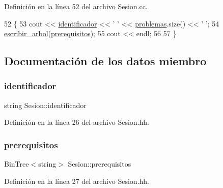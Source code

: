 Definición en la línea 52 del archivo Sesion.\+cc.


\begin{DoxyCode}
52                              \{
53   cout << \mbox{\hyperlink{class_sesion_a1b9a6519f3476c8c733792dee9b9c842}{identificador}} << \textcolor{charliteral}{' '} << \mbox{\hyperlink{class_sesion_af3929f5b3478c9ab1334b4c62566d69e}{problemas}}.size() << \textcolor{charliteral}{' '};
54   \mbox{\hyperlink{class_sesion_a05641874607ce3a3b3c495437938bf02}{escribir\_arbol}}(\mbox{\hyperlink{class_sesion_abdfe53bdef12bfa9ab510cad99b0de27}{prerequisitos}});
55   cout << endl;
56 
57 \}
\end{DoxyCode}


\subsection{Documentación de los datos miembro}
\mbox{\label{class_sesion_a1b9a6519f3476c8c733792dee9b9c842}} 
\subsubsection{\texorpdfstring{identificador}{identificador}}
{\footnotesize\ttfamily string Sesion\+::identificador\hspace{0.3cm}{\ttfamily [private]}}



Definición en la línea 26 del archivo Sesion.\+hh.

\mbox{\label{class_sesion_abdfe53bdef12bfa9ab510cad99b0de27}} 
\subsubsection{\texorpdfstring{prerequisitos}{prerequisitos}}
{\footnotesize\ttfamily Bin\+Tree$<$string$>$ Sesion\+::prerequisitos\hspace{0.3cm}{\ttfamily [private]}}



Definición en la línea 27 del archivo Sesion.\+hh.

\mbox{\label{class_sesion_af3929f5b3478c9ab1334b4c62566d69e}} 
